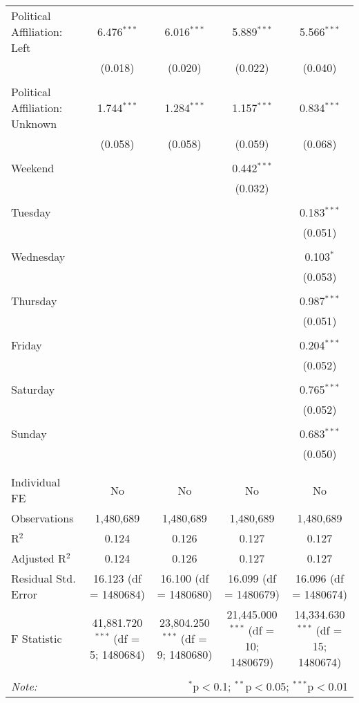 \documentclass[
]{article}
\begin{document}
\begin{table}[!htbp]
{\begin{tabular}{@{\extracolsep{5pt}}lcccc}
 Political Affiliation: Left & 6.476$^{***}$ & 6.016$^{***}$ & 5.889$^{***}$ & 5.566$^{***}$ \\ 
  & (0.018) & (0.020) & (0.022) & (0.040) \\ 
  & & & & \\ 
 Political Affiliation: Unknown & 1.744$^{***}$ & 1.284$^{***}$ & 1.157$^{***}$ & 0.834$^{***}$ \\ 
  & (0.058) & (0.058) & (0.059) & (0.068) \\ 
  & & & & \\ 
 Weekend &  &  & 0.442$^{***}$ &  \\ 
  &  &  & (0.032) &  \\ 
  & & & & \\ 
 Tuesday &  &  &  & 0.183$^{***}$ \\ 
  &  &  &  & (0.051) \\ 
  & & & & \\ 
 Wednesday &  &  &  & 0.103$^{*}$ \\ 
  &  &  &  & (0.053) \\ 
  & & & & \\ 
 Thursday &  &  &  & 0.987$^{***}$ \\ 
  &  &  &  & (0.051) \\ 
  & & & & \\ 
 Friday &  &  &  & 0.204$^{***}$ \\ 
  &  &  &  & (0.052) \\ 
  & & & & \\ 
 Saturday &  &  &  & 0.765$^{***}$ \\ 
  &  &  &  & (0.052) \\ 
  & & & & \\ 
 Sunday &  &  &  & 0.683$^{***}$ \\ 
  &  &  &  & (0.050) \\ 
  & & & & \\ 
\hline \\[-1.8ex] 
Individual FE & No & No & No & No \\ 
Observations & 1,480,689 & 1,480,689 & 1,480,689 & 1,480,689 \\ 
R$^{2}$ & 0.124 & 0.126 & 0.127 & 0.127 \\ 
Adjusted R$^{2}$ & 0.124 & 0.126 & 0.127 & 0.127 \\ 
Residual Std. Error & 16.123 (df = 1480684) & 16.100 (df = 1480680) & 16.099 (df = 1480679) & 16.096 (df = 1480674) \\ 
F Statistic & 41,881.720$^{***}$ (df = 5; 1480684) & 23,804.250$^{***}$ (df = 9; 1480680) & 21,445.000$^{***}$ (df = 10; 1480679) & 14,334.630$^{***}$ (df = 15; 1480674) \\ 
\hline 
\hline \\[-1.8ex] 
\textit{Note:}  & \multicolumn{4}{r}{$^{*}$p$<$0.1; $^{**}$p$<$0.05; $^{***}$p$<$0.01} \\ 
\end{tabular}
} 
\end{table} 
\newpage
\end{document}
